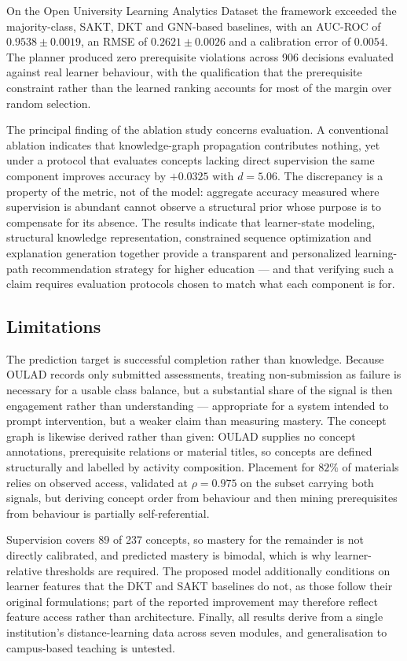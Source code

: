 On the Open University Learning Analytics Dataset the framework exceeded the
majority-class, SAKT, DKT and GNN-based baselines, with an AUC-ROC of
$0.9538 \pm 0.0019$, an RMSE of $0.2621 \pm 0.0026$ and a calibration error of $0.0054$.
The planner produced zero prerequisite violations across 906 decisions evaluated against
real learner behaviour, with the qualification that the prerequisite constraint rather than
the learned ranking accounts for most of the margin over random selection.

The principal finding of the ablation study concerns evaluation. A conventional ablation
indicates that knowledge-graph propagation contributes nothing, yet under a protocol that
evaluates concepts lacking direct supervision the same component improves accuracy by
$+0.0325$ with $d = 5.06$. The discrepancy is a property of the metric, not of the model:
aggregate accuracy measured where supervision is abundant cannot observe a structural
prior whose purpose is to compensate for its absence. The results indicate that learner-state modeling, structural
knowledge representation, constrained sequence optimization and explanation generation
together provide a transparent and personalized learning-path recommendation strategy for
higher education --- and that verifying such a claim requires evaluation protocols chosen
to match what each component is for.

\subsection{Limitations}

The prediction target is successful completion rather than knowledge. Because OULAD records
only submitted assessments, treating non-submission as failure is necessary for a usable
class balance, but a substantial share of the signal is then engagement rather than
understanding --- appropriate for a system intended to prompt intervention, but a weaker
claim than measuring mastery. The concept graph is likewise derived rather than given:
OULAD supplies no concept annotations, prerequisite relations or material titles, so
concepts are defined structurally and labelled by activity composition. Placement for
$82\%$ of materials relies on observed access, validated at $\rho = 0.975$ on the subset
carrying both signals, but deriving concept order from behaviour and then mining
prerequisites from behaviour is partially self-referential.

Supervision covers 89 of 237 concepts, so mastery for the remainder is not directly
calibrated, and predicted mastery is bimodal, which is why learner-relative thresholds are
required. The proposed model additionally conditions on learner features that the DKT and
SAKT baselines do not, as those follow their original formulations; part of the reported
improvement may therefore reflect feature access rather than architecture. Finally, all
results derive from a single institution's distance-learning data across seven modules,
and generalisation to campus-based teaching is untested.

